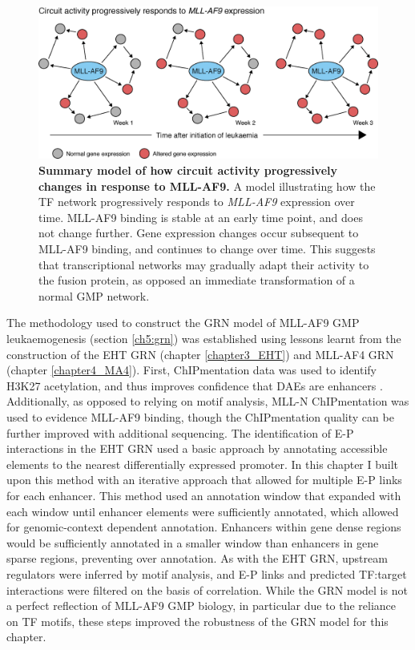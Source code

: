 \begin{figure}[htbp]
    \centering
    \includegraphics[width=\textwidth,height=\textheight,keepaspectratio]{figures/models/ch5_model-time.png}
    \caption[{Summary model of how circuit activity progressively changes in response to MLL-AF9.}]
    {\textbf{Summary model of how circuit activity progressively changes in response to MLL-AF9.}
    A model illustrating how the TF network progressively responds to \textit{MLL-AF9} expression over time. MLL-AF9 binding is stable at an early time point, and does not change further. Gene expression changes occur subsequent to MLL-AF9 binding, and continues to change over time. This suggests that transcriptional networks may gradually adapt their activity to the fusion protein, as opposed an immediate transformation of a normal GMP network.
    }
    \label{fig:ch5_model-time}
\end{figure}

The methodology used to construct the GRN model of MLL-AF9 GMP leukaemogenesis (section \ref{ch5:grn}) was established using lessons learnt from the construction of the EHT GRN (chapter \ref{chapter3_EHT}) and MLL-AF4 GRN (chapter \ref{chapter4_MA4}). First, ChIPmentation data was used to identify H3K27 acetylation, and thus improves confidence that DAEs are enhancers \citep{heintzman_histone_2009, heintzman_distinct_2007, creyghton_histone_2010}. Additionally, as opposed to relying on motif analysis, MLL-N ChIPmentation was used to evidence MLL-AF9 binding, though the ChIPmentation quality can be further improved with additional sequencing. The identification of E-P interactions in the EHT GRN used a basic approach by annotating accessible elements to the nearest differentially expressed promoter. In this chapter I built upon this method with an iterative approach that allowed for multiple E-P links for each enhancer. This method used an annotation window that expanded with each window until enhancer elements were sufficiently annotated, which allowed for genomic-context dependent annotation. Enhancers within gene dense regions would be sufficiently annotated in a smaller window than enhancers in gene sparse regions, preventing over annotation. As with the EHT GRN, upstream regulators were inferred by motif analysis, and E-P links and predicted TF:target interactions were filtered on the basis of correlation. While the GRN model is not a perfect reflection of MLL-AF9 GMP biology, in particular due to the reliance on TF motifs, these steps improved the robustness of the GRN model for this chapter.

